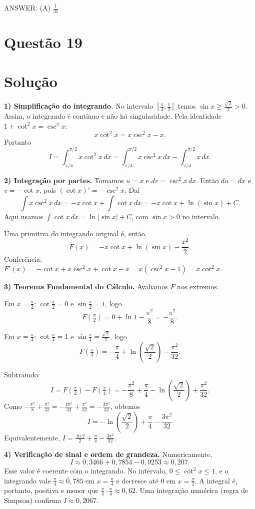 \documentclass{article}%
\begin{document}
ANSWER: (A) $\frac{1}{31}$%
\newpage%
\section*{Questão 19}

\section*{Solução}

\textbf{1) Simplificação do integrando.} No intervalo $\left[\frac{\pi}{4},\frac{\pi}{2}\right]$ temos $\sin x \ge \frac{\sqrt{2}}{2} > 0$. Assim, o integrando é contínuo e não há singularidade. Pela identidade $1+\cot^2 x=\csc^2 x$:
\[
x\cot^2 x = x\csc^2 x - x .
\]
Portanto
\[
I=\int_{\pi/4}^{\pi/2} x\cot^2 x\,dx=\int_{\pi/4}^{\pi/2} x\csc^2 x\,dx-\int_{\pi/4}^{\pi/2} x\,dx .
\]

\textbf{2) Integração por partes.} Tomamos $u=x$ e $dv=\csc^2 x\,dx$. Então $du=dx$ e $v=-\cot x$, pois $(\cot x)'=-\csc^2 x$. Daí
\[
\int x\csc^2 x\,dx=-x\cot x+\int \cot x\,dx=-x\cot x+\ln(\sin x)+C .
\]
Aqui usamos $\int \cot x\,dx=\ln|\sin x|+C$, com $\sin x>0$ no intervalo.

Uma primitiva do integrando original é, então,
\[
F(x)=-x\cot x+\ln(\sin x)-\frac{x^2}{2}.
\]
Conferência: $F'(x)=-\cot x+x\csc^2 x+\cot x-x=x(\csc^2 x-1)=x\cot^2 x$.

\textbf{3) Teorema Fundamental do Cálculo.} Avaliamos $F$ nos extremos.

Em $x=\frac{\pi}{2}$: $\cot\frac{\pi}{2}=0$ e $\sin\frac{\pi}{2}=1$, logo
\[
F\!\left(\tfrac{\pi}{2}\right)=0+\ln 1-\frac{\pi^2}{8}=-\frac{\pi^2}{8}.
\]

Em $x=\frac{\pi}{4}$: $\cot\frac{\pi}{4}=1$ e $\sin\frac{\pi}{4}=\frac{\sqrt2}{2}$, logo
\[
F\!\left(\tfrac{\pi}{4}\right)=-\frac{\pi}{4}+\ln\!\left(\frac{\sqrt2}{2}\right)-\frac{\pi^2}{32}.
\]

Subtraindo:
\[
I=F\!\left(\tfrac{\pi}{2}\right)-F\!\left(\tfrac{\pi}{4}\right)
=-\frac{\pi^2}{8}+\frac{\pi}{4}-\ln\!\left(\frac{\sqrt2}{2}\right)+\frac{\pi^2}{32}.
\]
Como $-\frac{\pi^2}{8}+\frac{\pi^2}{32}=-\frac{4\pi^2}{32}+\frac{\pi^2}{32}=-\frac{3\pi^2}{32}$, obtemos
\[
\boxed{I=-\ln\!\left(\frac{\sqrt2}{2}\right)+\frac{\pi}{4}-\frac{3\pi^2}{32}}
\]
Equivalentemente, $I=\frac{\ln 2}{2}+\frac{\pi}{4}-\frac{3\pi^2}{32}$.

\textbf{4) Verificação de sinal e ordem de grandeza.} Numericamente,
\[
I\approx 0{,}3466+0{,}7854-0{,}9253\approx 0{,}207 .
\]
Esse valor é coerente com o integrando. No intervalo, $0\le \cot^2 x\le 1$, e o integrando vale $\frac{\pi}{4}\approx 0{,}785$ em $x=\frac{\pi}{4}$ e decresce até $0$ em $x=\frac{\pi}{2}$. A integral é, portanto, positiva e menor que $\frac{\pi}{4}\cdot\frac{\pi}{4}\approx 0{,}62$. Uma integração numérica (regra de Simpson) confirma $I\approx 0{,}2067$.
\end{document}
